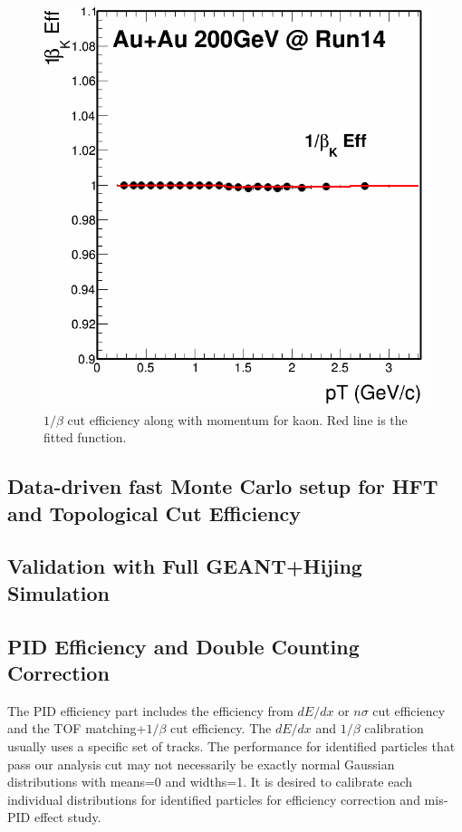 \documentclass[a4paper]{article}
\begin{document}
\begin{figure}[htbp]
\begin{minipage}[htbp]{0.5\linewidth}
\includegraphics[width=1.0\textwidth]{fig/nSigKaonTof_eff.png}
\caption{$1/\beta$ cut efficiency along with momentum for kaon. Red line is the fitted function. \label{fig:kaontofeff}}
\end{minipage}
\end{figure}


\subsection{Data-driven fast Monte Carlo setup for HFT and Topological Cut Efficiency}

\subsection{Validation with Full GEANT+Hijing Simulation}

\subsection{PID Efficiency and Double Counting Correction}

The PID efficiency part includes the efficiency from $dE/dx$ or $n\sigma$ cut efficiency and the TOF matching+$1/\beta$ cut efficiency. The $dE/dx$ and $1/\beta$ calibration usually uses a specific set of tracks. The performance for identified particles that pass our analysis cut may not necessarily be exactly normal Gaussian distributions with means=0 and widths=1. It is desired to calibrate each individual distributions for identified particles for efficiency correction and mis-PID effect study.
\end{document}
